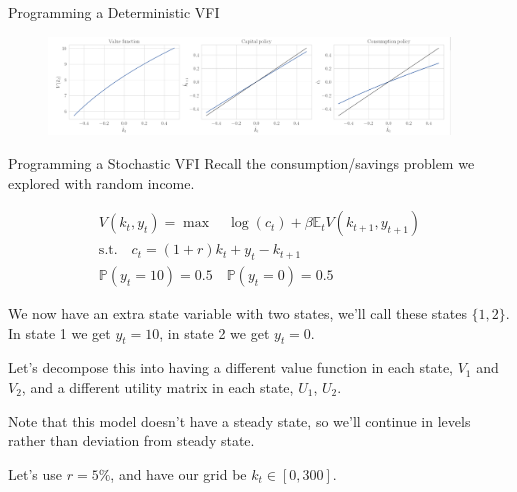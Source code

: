 \documentclass[11pt, xcolor={dvipsnames}, hyperref={colorlinks, allcolors=Blue}]{beamer}
\begin{document}
\begin{frame}{Programming a Deterministic VFI}
\begin{figure}
	\includegraphics[width=0.95\textwidth]{Chart1.png}
	\hfill
\end{figure}

\end{frame}
\begin{frame}{Programming a Stochastic VFI}
Recall the consumption/savings problem we explored with random income.

\begin{gather*}
V(k_{t}, y_{t}) = \max \quad \log(c_{t}) + \beta \mathbb{E}_{t} V(k_{t+1}, y_{t+1})\\
\text{s.t.} \quad c_{t} = (1+r)k_{t} + y_{t} - k_{t+1}\\
\mathbb{P}(y_{t} = 10) = 0.5 \quad \mathbb{P}(y_{t} = 0) = 0.5
\end{gather*}
\bigskip

We now have an extra state variable with two states, we'll call these states $\{1, 2\}$. In state 1 we get $y_t = 10$, in state 2 we get $y_t = 0$.\bigskip

Let's decompose this into having a different value function in each state, $V_{1}$ and $V_{2}$, and a different utility matrix 
in each state, $U_{1}$, $U_{2}$. \bigskip

Note that this model doesn't have a steady state, so we'll continue in levels rather than deviation from steady state.\bigskip

Let's use $r = 5\%$, and have our grid be $k_{t} \in [0, 300]$. 

\end{frame}
\end{document}

